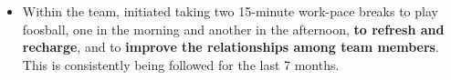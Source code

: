 \documentclass[a4paper,11pt]{article}
\begin{document}
\begin{itemize}
\begin{itemize}
			\item Within the team, initiated taking two 15-minute work-pace breaks to play foosball, one in the morning and another in the afternoon, \textbf{to refresh and recharge}, and to \textbf{improve the relationships among team members}. This is consistently being followed for the last 7 months.
		\end{itemize}


\end{itemize}
\end{document}
